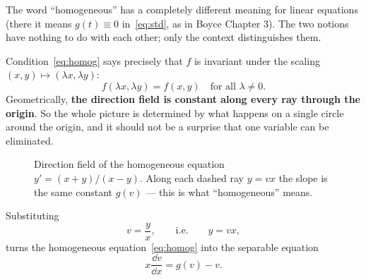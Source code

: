\begin{abuse}
	The word ``homogeneous'' has a completely different meaning for linear equations
	(there it means \(g(t) \equiv 0\) in~\eqref{eq:std}, as in Boyce Chapter 3). The two
	notions have nothing to do with each other; only the context distinguishes them.
\end{abuse}

\begin{observation}
	Condition~\eqref{eq:homog} says precisely that \(f\) is invariant under the scaling
	\((x,y) \mapsto (\lambda x, \lambda y)\):
	\[
		f(\lambda x, \lambda y) = f(x, y) \quad \text{for all } \lambda \neq 0.
	\]
	Geometrically, \textbf{the direction field is constant along every ray through the
		origin}. So the whole picture is determined by what happens on a single circle around
	the origin, and it should not be a surprise that one variable can be eliminated.
\end{observation}

\begin{figure}[H]
	\centering
	\caption{Direction field of the homogeneous equation
		\(y' = (x+y)/(x-y)\). Along each dashed ray \(y = vx\) the slope is the same
		constant \(g(v)\) --- this is what ``homogeneous'' means.}
\end{figure}

\begin{theorem}\label{thm:homog}
	Substituting
	\[
		v = \frac{y}{x}, \qquad\text{i.e.}\qquad y = v x,
	\]
	turns the homogeneous equation~\eqref{eq:homog} into the separable equation
	\begin{equation}\label{eq:homog-sep}
		x \frac{\dd v}{\dd x} = g(v) - v.
	\end{equation}
\end{theorem}

